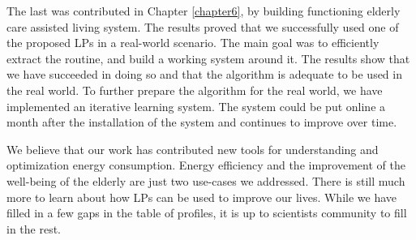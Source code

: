 The last was contributed in Chapter \ref{chapter6}, by building functioning elderly care assisted living system. 
The results proved that we successfully used one of the proposed LPs in a real-world scenario. 
The main goal was to efficiently extract the routine, and build a working system around it.
The results show that we have succeeded in doing so and that the algorithm is adequate to be used in the real world.
To further prepare the algorithm for the real world, we have implemented an iterative learning system.
The system could be put online a month after the installation of the system and continues to improve over time.

We believe that our work has contributed new tools for understanding and optimization energy consumption.
Energy efficiency and the improvement of the well-being of the elderly are just two use-cases we addressed.
There is still much more to learn about how LPs can be used to improve our lives.
While we have filled in a few gaps in the table of profiles, it is up to scientists community to fill in the rest.



